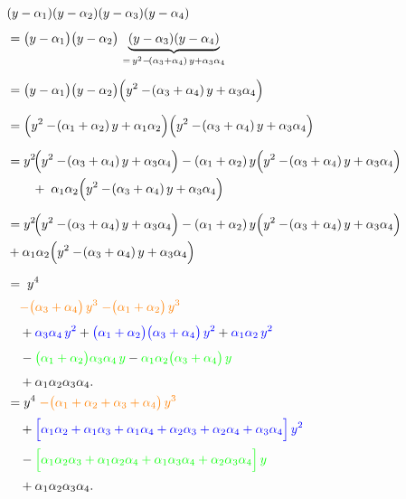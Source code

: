 \begin{solution}
  
  \begin{align*}
  & (y-\alpha_{1})(y-\alpha_{2})(y-\alpha_{3})(y-\alpha_{4}) \\[4pt]
  &= \bigl(y-\alpha_{1}\bigr)\bigl(y-\alpha_{2}\bigr)\,\underbrace{(y-\alpha_{3})(y-\alpha_{4})}_{%
        =\,y^{2}-\!(\alpha_{3}+\alpha_{4})\,y+\alpha_{3}\alpha_{4}} \\[6pt]
  &= \bigl(y-\alpha_{1}\bigr)\bigl(y-\alpha_{2}\bigr)
    \Bigl(y^{2}-\!(\alpha_{3}+\alpha_{4})\,y+\alpha_{3}\alpha_{4}\Bigr) \\[6pt]
  &= \Bigl(y^{2}-\!(\alpha_{1}+\alpha_{2})\,y+\alpha_{1}\alpha_{2}\Bigr)
    \Bigl(y^{2}-\!(\alpha_{3}+\alpha_{4})\,y+\alpha_{3}\alpha_{4}\Bigr) \\[6pt]
  &= y^{2}\!\Bigl(y^{2}-\!(\alpha_{3}+\alpha_{4})\,y+\alpha_{3}\alpha_{4}\Bigr)
    -(\alpha_{1}+\alpha_{2})\,y\Bigl(y^{2}-\!(\alpha_{3}+\alpha_{4})\,y+\alpha_{3}\alpha_{4}\Bigr)\\
  &\qquad +\;\alpha_{1}\alpha_{2}
            \Bigl(y^{2}-\!(\alpha_{3}+\alpha_{4})\,y+\alpha_{3}\alpha_{4}\Bigr) \\[6pt]
  &= y^{2}\!\Bigl(y^{2}-\!(\alpha_{3}+\alpha_{4})\,y+\alpha_{3}\alpha_{4}\Bigr)
    -(\alpha_{1}+\alpha_{2})\,y\Bigl(y^{2}-\!(\alpha_{3}+\alpha_{4})\,y+\alpha_{3}\alpha_{4}\Bigr)\\
  &+\alpha_{1}\alpha_{2}\Bigl(y^{2}-\!(\alpha_{3}+\alpha_{4})\,y+\alpha_{3}\alpha_{4}\Bigr) \\[6pt]
  &=\; y^{4} \\[2pt]
  &\quad
    \textcolor{orange}{-\bigl(\alpha_{3}+\alpha_{4}\bigr)\,y^{3}}
    \;\textcolor{orange}{-\bigl(\alpha_{1}+\alpha_{2}\bigr)\,y^{3}} \\[4pt]
  &\quad
    +\textcolor{blue}{\alpha_{3}\alpha_{4}\,y^{2}}
    +\textcolor{blue}{\bigl(\alpha_{1}+\alpha_{2}\bigr)\bigl(\alpha_{3}+\alpha_{4}\bigr)\,y^{2}}
    +\textcolor{blue}{\alpha_{1}\alpha_{2}\,y^{2}} \\[4pt]
  &\quad
    -\textcolor{green}{\bigl(\alpha_{1}+\alpha_{2}\bigr)\alpha_{3}\alpha_{4}\,y}
    -\textcolor{green}{\alpha_{1}\alpha_{2}\bigl(\alpha_{3}+\alpha_{4}\bigr)\,y} \\[4pt]
  &\quad
    +\alpha_{1}\alpha_{2}\alpha_{3}\alpha_{4}.\\
  &= y^{4}
    \;\textcolor{orange}{-\bigl(\alpha_{1}+\alpha_{2}+\alpha_{3}+\alpha_{4}\bigr)\,y^{3}} \\[2pt]
  &\quad
    +\textcolor{blue}{\Bigl[\alpha_{1}\alpha_{2}+\alpha_{1}\alpha_{3}+\alpha_{1}\alpha_{4}
                        +\alpha_{2}\alpha_{3}+\alpha_{2}\alpha_{4}+\alpha_{3}\alpha_{4}\Bigr]\,y^{2}} \\[2pt]
  &\quad
    -\textcolor{green}{\Bigl[\alpha_{1}\alpha_{2}\alpha_{3}
                              +\alpha_{1}\alpha_{2}\alpha_{4}
                              +\alpha_{1}\alpha_{3}\alpha_{4}
                              +\alpha_{2}\alpha_{3}\alpha_{4}\Bigr]\,y} \\[2pt]
  &\quad
    +\alpha_{1}\alpha_{2}\alpha_{3}\alpha_{4}.
  \end{align*}


\end{solution}
